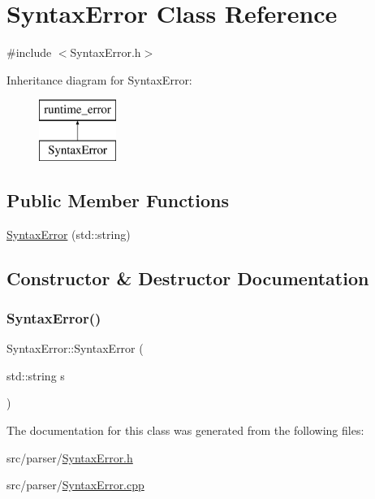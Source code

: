 \hypertarget{class_syntax_error}{}\section{Syntax\+Error Class Reference}
\label{class_syntax_error}


{\ttfamily \#include $<$Syntax\+Error.\+h$>$}

Inheritance diagram for Syntax\+Error\+:\begin{figure}[H]
\begin{center}
\leavevmode
\includegraphics[height=2.000000cm]{class_syntax_error}
\end{center}
\end{figure}
\subsection*{Public Member Functions}
\begin{DoxyCompactItemize}
\item 
\hyperlink{class_syntax_error_a41285cf1cafd071040aec4382e0d7dcd}{Syntax\+Error} (std\+::string)
\end{DoxyCompactItemize}


\subsection{Constructor \& Destructor Documentation}
\mbox{\label{class_syntax_error_a41285cf1cafd071040aec4382e0d7dcd}} 
\subsubsection{\texorpdfstring{Syntax\+Error()}{SyntaxError()}}
{\footnotesize\ttfamily Syntax\+Error\+::\+Syntax\+Error (\begin{DoxyParamCaption}\item[{std\+::string}]{s }\end{DoxyParamCaption})\hspace{0.3cm}{\ttfamily [explicit]}}



The documentation for this class was generated from the following files\+:\begin{DoxyCompactItemize}
\item 
src/parser/\hyperlink{_syntax_error_8h}{Syntax\+Error.\+h}\item 
src/parser/\hyperlink{_syntax_error_8cpp}{Syntax\+Error.\+cpp}\end{DoxyCompactItemize}
